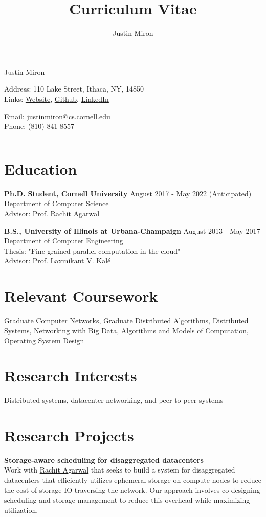 \documentclass[10pt]{article}
\title{Curriculum Vitae}
\author{Justin Miron}
\makeatletter
\newcommand{\Hrule}{\par\rule{\linewidth}{0.3mm}}
\newcommand{\leftrightrow}[2]{
	#1 \hfill #2 \\
}
\newcommand{\titlesection}{
\parindent=0pt
\setlength{\parskip}{0.1em}

\par{\begin{center}\LARGE Justin Miron\end{center}}

\begin{minipage}[t]{0.40\textwidth}
Address: 110 Lake Street, Ithaca, NY, 14850 \\
Links: \href{http://justinmiron.com}{Website}, \href{https://github.com/jmiron11}{Github}, \href{https://www.linkedin.com/in/justinmiron/}{LinkedIn}
\end{minipage}
\hfill
\begin{minipage}[t]{0.40\textwidth}
Email: \href{mailto:justinmiron@cs.cornell.edu}{justinmiron@cs.cornell.edu} \\
Phone: (810) 841-8557
\end{minipage}
\vspace{0.3em}
\Hrule
}
\newcommand{\researchblock}[3]{
	\leftrightrow{\textbf{#1}}{#2}#3
}
\newcommand{\educationblock}[3]{
	\leftrightrow{\textbf{#1}}{#2}
    #3
}
\makeatother
\begin{document}
\titlesection
\setlength{\parskip}{0em}

\section{Education}
\vspace{0.1em}
\educationblock{Ph.D. Student, Cornell University}{August 2017 - May 2022 (Anticipated)}{Department of Computer Science \\
Advisor: \href{http://www.cs.cornell.edu/~ragarwal/}{Prof. Rachit Agarwal}}
\vspace{0.5em}

\educationblock{B.S., University of Illinois at Urbana-Champaign}{August 2013 - May 2017}{Department of Computer Engineering \\
Thesis: "Fine-grained parallel computation in the cloud" \\
Advisor: \href{http://charm.cs.uiuc.edu/~kale/}{Prof. Laxmikant V. Kal\'e}}

\section{Relevant Coursework}
\vspace{0.1em}
Graduate Computer Networks, Graduate Distributed Algorithms, Distributed Systems, Networking with Big Data, Algorithms and Models of Computation, Operating System Design

\section{Research Interests}
\vspace{0.1em}
Distributed systems, datacenter networking, and peer-to-peer systems

\section{Research Projects}
\vspace{0.1em}
\researchblock{Storage-aware scheduling for disaggregated datacenters}{}
{
	Work with \href{http://www.cs.cornell.edu/~ragarwal/}{Rachit Agarwal} that seeks to build a system for disaggregated datacenters that efficiently utilizes ephemeral storage on compute nodes to reduce the cost of storage IO traversing the network. Our approach involves co-designing scheduling and storage management to reduce this overhead while maximizing utilization.
}

\vspace{0.6em}
\end{document}
